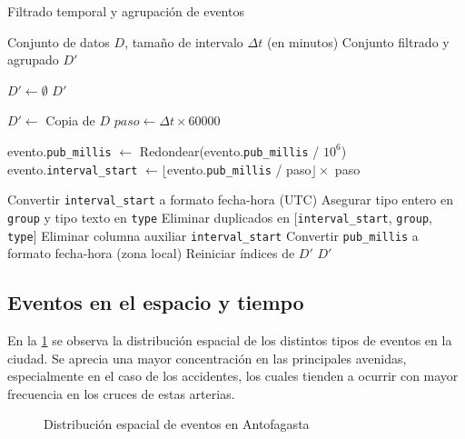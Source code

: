 \documentclass[12pt]{article}
\begin{document}
\begin{algorithm}[H]
\caption{Filtrado temporal y agrupación de eventos}
\label{alg:filter}
\begin{algorithmic}[1]
\Require Conjunto de datos $D$, tamaño de intervalo $\Delta t$ (en minutos)
\Ensure Conjunto filtrado y agrupado $D'$

\State $D' \gets \emptyset$
    \State \Return $D'$
\EndIf

\State $D' \gets$ Copia de $D$
\State $paso \gets \Delta t \times 60000$ 

        \State evento.\texttt{pub\_millis} $\gets$ Redondear(evento.\texttt{pub\_millis} / $10^6$)
    \EndIf
    \State evento.\texttt{interval\_start} $\gets \lfloor$evento.\texttt{pub\_millis} / paso$\rfloor \times$ paso
\EndFor

\State Convertir \texttt{interval\_start} a formato fecha-hora (UTC)
\State Asegurar tipo entero en \texttt{group} y tipo texto en \texttt{type}
\State Eliminar duplicados en [\texttt{interval\_start}, \texttt{group}, \texttt{type}]
\State Eliminar columna auxiliar \texttt{interval\_start}
\State Convertir \texttt{pub\_millis} a formato fecha-hora (zona local)
\State Reiniciar índices de $D'$
\State \Return $D'$
\end{algorithmic}
\end{algorithm}


\subsection{Eventos en el espacio y tiempo}

En la \cref{fig:dist_events} se observa la distribución espacial de los distintos tipos de eventos en la ciudad. Se aprecia una mayor concentración en las principales avenidas, especialmente en el caso de los accidentes, los cuales tienden a ocurrir con mayor frecuencia en los cruces de estas arterias.

\begin{figure}[H]
    \centering
    \caption{Distribución espacial de eventos en Antofagasta}
    \label{fig:dist_events}
\end{figure}
\end{document}
